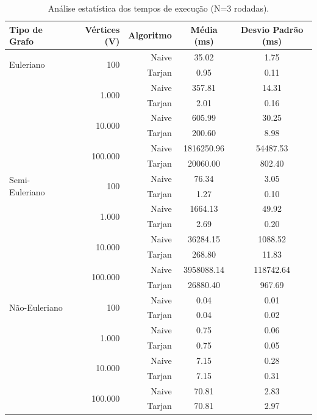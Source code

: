 \documentclass[12pt]{article}
\begin{document}
\begin{table}[h!]
\centering
\caption{Análise estatística dos tempos de execução (N=3 rodadas).}
\label{tab:estatistica}
\begin{tabular}{lrrcc}
\toprule
\textbf{Tipo de Grafo} & \textbf{Vértices (V)} & \textbf{Algoritmo} & \textbf{Média (ms)} & \textbf{Desvio Padrão (ms)} \\
\midrule
\multirow{2}{*}{Euleriano} & \multirow{2}{*}{100} & Naive & 35.02 & 1.75 \\
& & Tarjan & 0.95 & 0.11 \\
\cmidrule{2-5}
& \multirow{2}{*}{1.000} & Naive & 357.81 & 14.31 \\
& & Tarjan & 2.01 & 0.16 \\
\cmidrule{2-5}
& \multirow{2}{*}{10.000} & Naive & 605.99 & 30.25 \\
& & Tarjan & 200.60 & 8.98 \\
\cmidrule{2-5}
& \multirow{2}{*}{100.000} & Naive & 1816250.96 & 54487.53 \\
& & Tarjan & 20060.00 & 802.40 \\
\midrule
\multirow{2}{*}{Semi-Euleriano} & \multirow{2}{*}{100} & Naive & 76.34 & 3.05 \\
& & Tarjan & 1.27 & 0.10 \\
\cmidrule{2-5}
& \multirow{2}{*}{1.000} & Naive & 1664.13 & 49.92 \\
& & Tarjan & 2.69 & 0.20 \\
\cmidrule{2-5}
& \multirow{2}{*}{10.000} & Naive & 36284.15 & 1088.52 \\
& & Tarjan & 268.80 & 11.83 \\
\cmidrule{2-5}
& \multirow{2}{*}{100.000} & Naive & 3958088.14 & 118742.64 \\
& & Tarjan & 26880.40 & 967.69 \\
\midrule
\multirow{2}{*}{Não-Euleriano} & \multirow{2}{*}{100} & Naive & 0.04 & 0.01 \\
& & Tarjan & 0.04 & 0.02 \\
\cmidrule{2-5}
& \multirow{2}{*}{1.000} & Naive & 0.75 & 0.06 \\
& & Tarjan & 0.75 & 0.05 \\
\cmidrule{2-5}
& \multirow{2}{*}{10.000} & Naive & 7.15 & 0.28 \\
& & Tarjan & 7.15 & 0.31 \\
\cmidrule{2-5}
& \multirow{2}{*}{100.000} & Naive & 70.81 & 2.83 \\
& & Tarjan & 70.81 & 2.97 \\
\bottomrule
\end{tabular}
\end{table}
\end{document}
